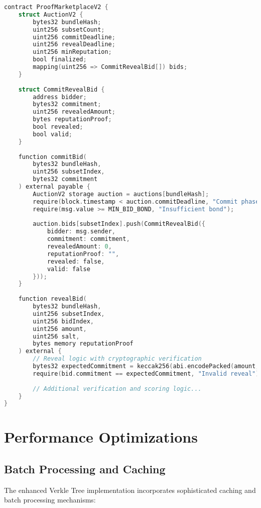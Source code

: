 \documentclass{article}
\begin{document}
\begin{lstlisting}[language=C,caption={MEV-Resistant Proof Marketplace},label={lst:marketplace}]
contract ProofMarketplaceV2 {
    struct AuctionV2 {
        bytes32 bundleHash;
        uint256 subsetCount;
        uint256 commitDeadline;
        uint256 revealDeadline;
        uint256 minReputation;
        bool finalized;
        mapping(uint256 => CommitRevealBid[]) bids;
    }
    
    struct CommitRevealBid {
        address bidder;
        bytes32 commitment;
        uint256 revealedAmount;
        bytes reputationProof;
        bool revealed;
        bool valid;
    }
    
    function commitBid(
        bytes32 bundleHash,
        uint256 subsetIndex,
        bytes32 commitment
    ) external payable {
        AuctionV2 storage auction = auctions[bundleHash];
        require(block.timestamp < auction.commitDeadline, "Commit phase ended");
        require(msg.value >= MIN_BID_BOND, "Insufficient bond");
        
        auction.bids[subsetIndex].push(CommitRevealBid({
            bidder: msg.sender,
            commitment: commitment,
            revealedAmount: 0,
            reputationProof: "",
            revealed: false,
            valid: false
        }));
    }
    
    function revealBid(
        bytes32 bundleHash,
        uint256 subsetIndex,
        uint256 bidIndex,
        uint256 amount,
        uint256 salt,
        bytes memory reputationProof
    ) external {
        // Reveal logic with cryptographic verification
        bytes32 expectedCommitment = keccak256(abi.encodePacked(amount, salt, reputationProof));
        require(bid.commitment == expectedCommitment, "Invalid reveal");
        
        // Additional verification and scoring logic...
    }
}
\end{lstlisting}

\section{Performance Optimizations}

\subsection{Batch Processing and Caching}

The enhanced Verkle Tree implementation incorporates sophisticated caching and batch processing mechanisms:
\end{document}
